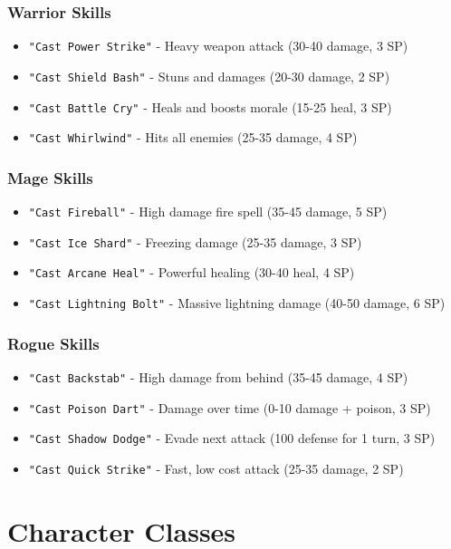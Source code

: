 \documentclass[12pt]{article}
\begin{document}
\subsubsection{Warrior Skills}
\begin{itemize}
    \item \texttt{"Cast Power Strike"} - Heavy weapon attack (30-40 damage, 3 SP)
    \item \texttt{"Cast Shield Bash"} - Stuns and damages (20-30 damage, 2 SP)
    \item \texttt{"Cast Battle Cry"} - Heals and boosts morale (15-25 heal, 3 SP)
    \item \texttt{"Cast Whirlwind"} - Hits all enemies (25-35 damage, 4 SP)
\end{itemize}

\subsubsection{Mage Skills}
\begin{itemize}
    \item \texttt{"Cast Fireball"} - High damage fire spell (35-45 damage, 5 SP)
    \item \texttt{"Cast Ice Shard"} - Freezing damage (25-35 damage, 3 SP)
    \item \texttt{"Cast Arcane Heal"} - Powerful healing (30-40 heal, 4 SP)
    \item \texttt{"Cast Lightning Bolt"} - Massive lightning damage (40-50 damage, 6 SP)
\end{itemize}

\subsubsection{Rogue Skills}
\begin{itemize}
    \item \texttt{"Cast Backstab"} - High damage from behind (35-45 damage, 4 SP)
    \item \texttt{"Cast Poison Dart"} - Damage over time (0-10 damage + poison, 3 SP)
    \item \texttt{"Cast Shadow Dodge"} - Evade next attack (100 defense for 1 turn, 3 SP)
    \item \texttt{"Cast Quick Strike"} - Fast, low cost attack (25-35 damage, 2 SP)
\end{itemize}

\section{Character Classes}
\label{sec:character-classes}
\end{document}
